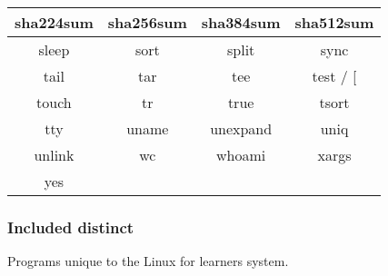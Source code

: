 \begin{itemize}
\begin{center}
\begin{tabular}{|c|c|c|c|}
                \hline
                sha224sum & sha256sum & sha384sum & sha512sum \\
                \hline
                sleep & sort & split & sync \\
                \hline
                tail & tar & tee & test / [ \\
                \hline
                touch & tr & true & tsort \\
                \hline
                tty & uname & unexpand & uniq \\
                \hline
                unlink & wc & whoami & xargs \\
                \hline
                yes \\
                \cline{1-1}
            \end{tabular}
        \end{center}
\end{itemize}

\newpage

\subsubsection{Included distinct}

Programs unique to the Linux for learners system.

